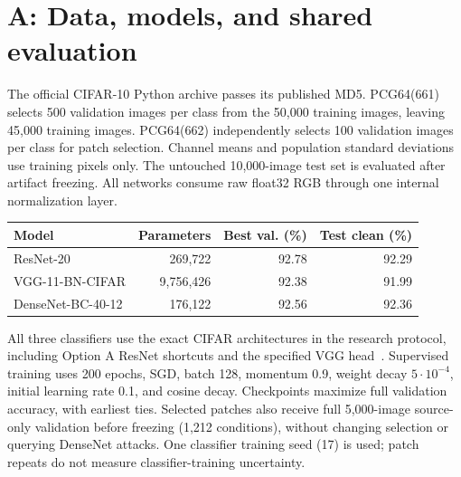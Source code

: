 \documentclass{article}
\begin{document}
\section{A: Data, models, and shared evaluation}
The official CIFAR-10 Python archive passes its published MD5. PCG64(661) selects 500 validation images per class from the 50,000 training images, leaving 45,000 training images. PCG64(662) independently selects 100 validation images per class for patch selection. Channel means and population standard deviations use training pixels only. The untouched 10,000-image test set is evaluated after artifact freezing. All networks consume raw float32 RGB through one internal normalization layer.
\begin{center}\small
\begin{tabular}{lrrr}\toprule
Model & Parameters & Best val. (\%) & Test clean (\%)\\\midrule
ResNet-20 & 269,722 & 92.78 & 92.29\\
VGG-11-BN-CIFAR & 9,756,426 & 92.38 & 91.99\\
DenseNet-BC-40-12 & 176,122 & 92.56 & 92.36\\
\bottomrule\end{tabular}\end{center}
All three classifiers use the exact CIFAR architectures in the research protocol, including Option A ResNet shortcuts and the specified VGG head~\cite{resnet,vgg,densenet}. Supervised training uses 200 epochs, SGD, batch 128, momentum 0.9, weight decay $5\cdot10^{-4}$, initial learning rate 0.1, and cosine decay. Checkpoints maximize full validation accuracy, with earliest ties. Selected patches also receive full 5,000-image source-only validation before freezing (1,212 conditions), without changing selection or querying DenseNet attacks. One classifier training seed (17) is used; patch repeats do not measure classifier-training uncertainty.
\clearpage
\end{document}
